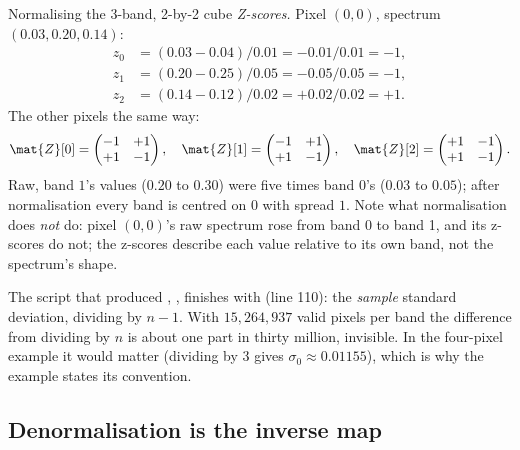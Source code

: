 \begin{worked}[label={we:bandpipeline:zscore}]{Normalising the 3-band, 2-by-2 cube}
\emph{Z-scores.} Pixel $(0,0)$, spectrum $(0.03, 0.20, 0.14)$:
\begin{align*}
z_0 &= (0.03 - 0.04)/0.01 = -0.01/0.01 = -1,\\
z_1 &= (0.20 - 0.25)/0.05 = -0.05/0.05 = -1,\\
z_2 &= (0.14 - 0.12)/0.02 = +0.02/0.02 = +1.
\end{align*}
The other pixels the same way:
\[
\mat{Z}[0] = \begin{pmatrix} -1 & +1 \\ +1 & -1 \end{pmatrix},\quad
\mat{Z}[1] = \begin{pmatrix} -1 & +1 \\ +1 & -1 \end{pmatrix},\quad
\mat{Z}[2] = \begin{pmatrix} +1 & -1 \\ +1 & -1 \end{pmatrix}.
\]
Raw, band $1$'s values ($0.20$ to $0.30$) were five times band $0$'s ($0.03$ to $0.05$); after
normalisation every band is centred on $0$ with spread $1$. Note what normalisation does \emph{not}
do: pixel $(0,0)$'s raw spectrum rose from band 0 to band 1, and its z-scores do not; the z-scores
describe each value relative to its own band, not the spectrum's shape.
\end{worked}

\begin{sourcenote}[: $n$ or $n-1$]
The script that produced ,
, finishes with  (line 110): the \emph{sample} standard deviation, dividing by $n - 1$. With $15{,}264{,}937$
valid pixels per band the difference from dividing by $n$
is about one part in thirty million, invisible. In the four-pixel example it would matter
(dividing by $3$ gives $\sigma_0 \approx 0.01155$), which is why the example states its convention.
\end{sourcenote}

\subsection{Denormalisation is the inverse map}

